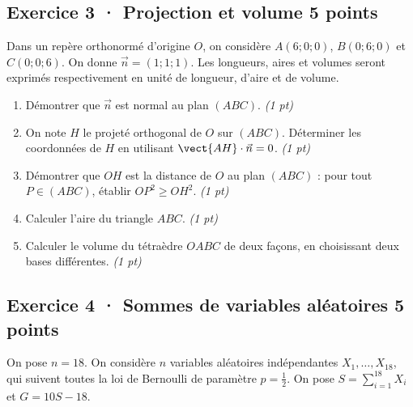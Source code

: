 \clearpage{}\par

\subsection*{Exercice 3 · Projection et volume \hfill 5 points}Dans un repère orthonormé d'origine $O$, on considère $A(6;0;0)$, $B(0;6;0)$ et $C(0;0;6)$. On donne $\vec n=(1;1;1)$. Les longueurs, aires et volumes seront exprimés respectivement en unité de longueur, d'aire et de volume.

\begin{enumerate}

\item Démontrer que $\vec n$ est normal au plan $(ABC)$. \hfill\textit{(1 pt)}

\item On note $H$ le projeté orthogonal de $O$ sur $(ABC)$. Déterminer les coordonnées de $H$ en utilisant $\vect{AH}\cdot\vec n=0$. \hfill\textit{(1 pt)}

\item Démontrer que $OH$ est la distance de $O$ au plan $(ABC)$ : pour tout $P\in(ABC)$, établir $OP^2\ge OH^2$. \hfill\textit{(1 pt)}

\item Calculer l'aire du triangle $ABC$. \hfill\textit{(1 pt)}

\item Calculer le volume du tétraèdre $OABC$ de deux façons, en choisissant deux bases différentes. \hfill\textit{(1 pt)}

\end{enumerate}

\subsection*{Exercice 4 · Sommes de variables aléatoires \hfill 5 points}On pose $n=18$. On considère $n$ variables aléatoires indépendantes $X_1,\ldots,X_{18}$, qui suivent toutes la loi de Bernoulli de paramètre $p=\frac{1}{2}$. On pose $S=\displaystyle\sum_{i=1}^{18}X_i$ et $G=10S-18$.

